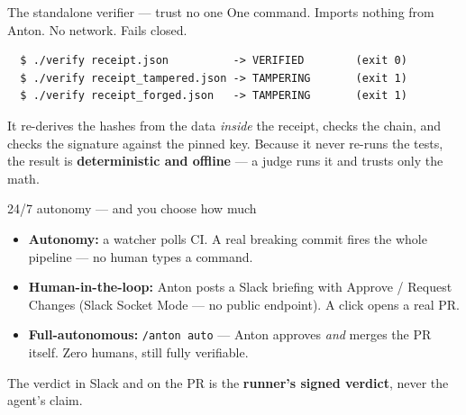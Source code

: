 \documentclass[aspectratio=169,11pt]{beamer}
\begin{document}
\begin{frame}[fragile]{The standalone verifier --- trust no one}
  One command. Imports nothing from Anton. No network. Fails closed.
  \begin{exampleblock}{}
  \begin{verbatim}
  $ ./verify receipt.json          -> VERIFIED        (exit 0)
  $ ./verify receipt_tampered.json -> TAMPERING       (exit 1)
  $ ./verify receipt_forged.json   -> TAMPERING       (exit 1)
  \end{verbatim}
  \end{exampleblock}
  It re-derives the hashes from the data \emph{inside} the receipt, checks the chain,
  and checks the signature against the pinned key. Because it never re-runs the tests,
  the result is \textbf{deterministic and offline} --- a judge runs it and trusts only
  the math.
\end{frame}

\begin{frame}{24/7 autonomy --- and you choose how much}
  \begin{itemize}
    \item \textbf{Autonomy:} a watcher polls CI. A real breaking commit fires the whole
          pipeline --- \alert{no human types a command}.
    \item \textbf{Human-in-the-loop:} Anton posts a Slack briefing with Approve / Request
          Changes (Slack Socket Mode --- no public endpoint). A click opens a real PR.
    \item \textbf{Full-autonomous:} \texttt{/anton auto} --- Anton approves \emph{and}
          merges the PR itself. Zero humans, still fully verifiable.
  \end{itemize}
  \vspace{0.5em}
  \begin{center}
    The verdict in Slack and on the PR is the \textbf{runner's signed verdict},
    never the agent's claim.
  \end{center}
\end{frame}
\end{document}
